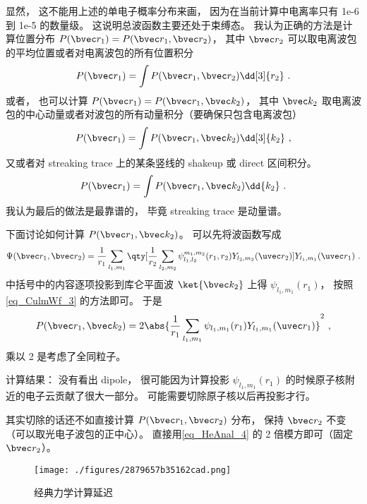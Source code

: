 显然， 这不能用上述的单电子概率分布来画， 因为在当前计算中电离率只有 1e-6 到 1e-5 的数量级。 这说明总波函数主要还处于束缚态。 我认为正确的方法是计算位置分布 $P(\bvec r_1) = P(\bvec r_1, \bvec r_2)$， 其中 $\bvec r_2$ 可以取电离波包的平均位置或者对电离波包的所有位置积分
\begin{equation}
P(\bvec r_1) = \int P(\bvec r_1, \bvec r_2) \dd[3]{r_2}~.
\end{equation}
或者， 也可以计算 $P(\bvec r_1) = P(\bvec r_1, \bvec k_2)$， 其中 $\bvec k_2$ 取电离波包的中心动量或者对波包的所有动量积分（要确保只包含电离波包）
\begin{equation}
P(\bvec r_1) = \int P(\bvec r_1, \bvec k_2) \dd[3]{k_2}~,
\end{equation}
又或者对 streaking trace 上的某条竖线的 shakeup 或 direct 区间积分。
\begin{equation}
P(\bvec r_1) = \int P(\bvec r_1, \bvec k_2) \dd{k_2}~.
\end{equation}
我认为最后的做法是最靠谱的， 毕竟 streaking trace 是动量谱。

下面讨论如何计算 $P(\bvec r_1, \bvec k_2)$。 可以先将波函数写成
\begin{equation}\label{eq_HeAnal_4}
\Psi(\bvec r_1, \bvec r_2) = \frac{1}{r_1}\sum_{l_1,m_1} \qty[\frac{1}{r_2}\sum_{l_2,m_2} \psi_{l_1,l_2}^{m_1,m_2}(r_1, r_2) Y_{l_2,m_2}(\uvec r_2)] Y_{l_1,m_1}(\uvec r_1)~.
\end{equation}
中括号中的内容逐项投影到库仑平面波 $\ket{\bvec k_2}$ 上得 $\psi_{l_1,m_1}(r_1)$， 按照\autoref{eq_CulmWf_3}  的方法即可。 于是
\begin{equation}\label{eq_HeAnal_1}
P(\bvec r_1, \bvec k_2) = 2\abs{\frac{1}{r_1}\sum_{l_1,m_1} \psi_{l_1,m_1}(r_1) Y_{l_1,m_1}(\uvec r_1)}^2~,
\end{equation}
乘以 2 是考虑了全同粒子。

计算结果： 没有看出 dipole， 很可能因为计算投影 $\psi_{l_1,m_1}(r_1)$ 的时候原子核附近的电子云贡献了很大一部分。 可能需要切除原子核以后再投影才行。

其实切除的话还不如直接计算 $P(\bvec r_1, \bvec r_2)$ 分布， 保持 $\bvec r_2$ 不变（可以取光电子波包的正中心）。 直接用\autoref{eq_HeAnal_4} 的 2 倍模方即可（固定 $\bvec r_2$）。

\begin{figure}[ht]
\centering
\texttt{[image: ./figures/2879657b35162cad.png]}
\caption{经典力学计算延迟} \label{fig_HeAnal_1}
\end{figure}

